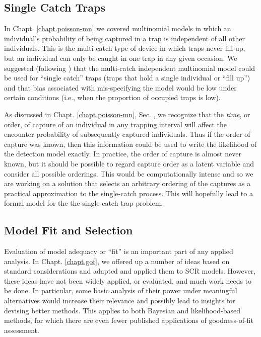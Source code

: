 \subsection{Single Catch Traps}

In Chapt. \ref{chapt.poisson-mn} we covered multinomial models in
which an individual's probability of being captured in a trap is
independent of all other individuals.  This is the multi-catch type of
device in which traps never fill-up, but an individual can only be
caught in one trap in any given occasion. We suggested (following
\citet{efford_etal:2009euring}) that the multi-catch independent
multinomial model could be used for ``single catch'' traps (traps that
hold a single individual or ``fill up'') and that bias associated with
mis-specifying the model would be low under certain conditions (i.e.,
when the proportion of occupied traps is low).

As discussed in Chapt. \ref{chapt.poisson-mn},
Sec. \label{poisson-mn.sec.singlecatch}, we recognize that the {\it
  time}, or order, of capture of an individual in any trapping
interval will affect the encounter probability of subsequently
captured individuals. Thus if the order of capture was known, then
this information could be used to write the likelihood of the
detection model exactly. In practice, the order of capture is almost
never known, but it should be possible to regard capture order as a
latent variable and consider all possible orderings.  This would be
computationally intense and so we are working on a solution that
selects an arbitrary ordering of the captures as a practical
approximation to the single-catch process. This will hopefully lead to
a formal model for the the single catch trap problem.

\subsection{Model Fit and Selection}

Evaluation of model adequacy or ``fit'' is an important part of any
applied analysis. In Chapt. \ref{chapt.gof}, we offered up a number of
ideas based on standard considerations and adapted and applied them to
SCR models. However, these ideas have not been widely applied, or
evaluated, and much work needs to be done. In particular, some basic
analysis of their power under meaningful alternatives would increase
their relevance and possibly lead to insights for devising better
methods. This applies to both Bayesian and likelihood-based methods,
for which there are even fewer published applications of
goodness-of-fit assessment.

